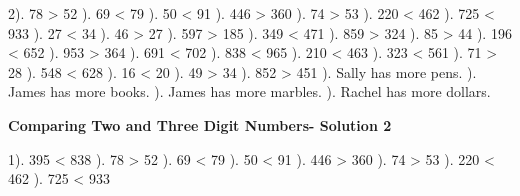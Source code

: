 \documentclass{article}%
\begin{document}
2). 78 > 52%
). 69 < 79%
). 50 < 91%
). 446 > 360%
). 74 > 53%
). 220 < 462%
). 725 < 933%
). 27 < 34%
). 46 > 27%
). 597 > 185%
). 349 < 471%
). 859 > 324%
). 85 > 44%
). 196 < 652%
). 953 > 364%
). 691 < 702%
). 838 < 965%
). 210 < 463%
). 323 < 561%
). 71 > 28%
). 548 < 628%
). 16 < 20%
). 49 > 34%
). 852 > 451%
). Sally has more pens.%
). James has more books.%
). James has more marbles.%
). Rachel has more dollars.%
\newline%
\newpage%
\large%
\begin{center}%
\textbf{Comparing Two and Three Digit Numbers- Solution 2}%
\newline%
\end{center} \normalsize%
1). 395 < 838%
). 78 > 52%
). 69 < 79%
). 50 < 91%
). 446 > 360%
). 74 > 53%
). 220 < 462%
). 725 < 933%
\newline%
\end{document}
